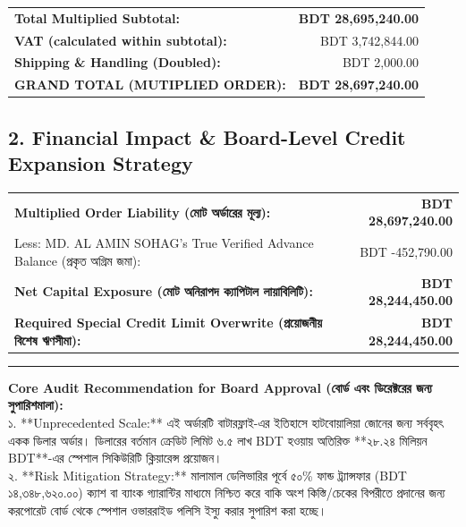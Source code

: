 \documentclass[9pt, a4paper]{article}
\begin{document}
\vspace{-4mm}
\noindent
\begin{tabularx}{\textwidth}{@{}X r@{}}
    \textbf{Total Multiplied Subtotal:} & \textbf{BDT 28,695,240.00} \\
    \textbf{VAT (calculated within subtotal):} & BDT 3,742,844.00 \\
    \textbf{Shipping \& Handling (Doubled):} & BDT 2,000.00 \\
    \midrule
    \textbf{GRAND TOTAL (MUTIPLIED ORDER):} & \textbf{BDT 28,697,240.00} \\
\end{tabularx}

\vspace{5mm}

\noindent
\subsection*{2. Financial Impact \& Board-Level Credit Expansion Strategy}
\begin{tcolorbox}[colback=warningbg, colframe=alertred, boxrule=0.5pt, title=\textbf{Urgent Financial Risk & Capital Clearance Analysis}]
    \fontsize{8.5}{11}\selectfont
    \begin{tabularx}{\textwidth}{@{}X r@{}}
        \textbf{Multiplied Order Liability (মোট অর্ডারের মূল্য):} & \textbf{BDT 28,697,240.00} \\
        Less: MD. AL AMIN SOHAG's True Verified Advance Balance (প্রকৃত অগ্রিম জমা): & BDT -452,790.00 \\
        \midrule
        \textbf{Net Capital Exposure (মোট অনিরাপদ ক্যাপিটাল লায়াবিলিটি):} & \textbf{BDT 28,244,450.00} \\
        \midrule
        \textbf{Required Special Credit Limit Overwrite (প্রয়োজনীয় বিশেষ ঋণসীমা):} & \textbf{BDT 28,244,450.00} \\
    \end{tabularx}
    \vspace{2mm}
    \hrule
    \vspace{2.5mm}
    \fontsize{8}{10}\selectfont
    \textbf{Core Audit Recommendation for Board Approval (বোর্ড এবং ডিরেক্টরের জন্য সুপারিশমালা):} \\
    ১. **Unprecedented Scale:** এই অর্ডারটি বাটারফ্লাই-এর ইতিহাসে হাটবোয়ালিয়া জোনের জন্য সর্ববৃহৎ একক ডিলার অর্ডার। ডিলারের বর্তমান ক্রেডিট লিমিট ৬.৫ লাখ BDT হওয়ায় অতিরিক্ত **২৮.২৪ মিলিয়ন BDT**-এর স্পেশাল সিকিউরিটি ক্লিয়ারেন্স প্রয়োজন। \\
    ২. **Risk Mitigation Strategy:** মালামাল ডেলিভারির পূর্বে ৫০\% ফান্ড ট্র্যান্সফার (BDT ১৪,৩৪৮,৬২০.০০) ক্যাশ বা ব্যাংক গ্যারান্টির মাধ্যমে নিশ্চিত করে বাকি অংশ কিস্তি/চেকের বিপরীতে প্রদানের জন্য করপোরেট বোর্ড থেকে স্পেশাল ওভাররাইড পলিসি ইস্যু করার সুপারিশ করা হচ্ছে।
\end{tcolorbox}
\end{document}
